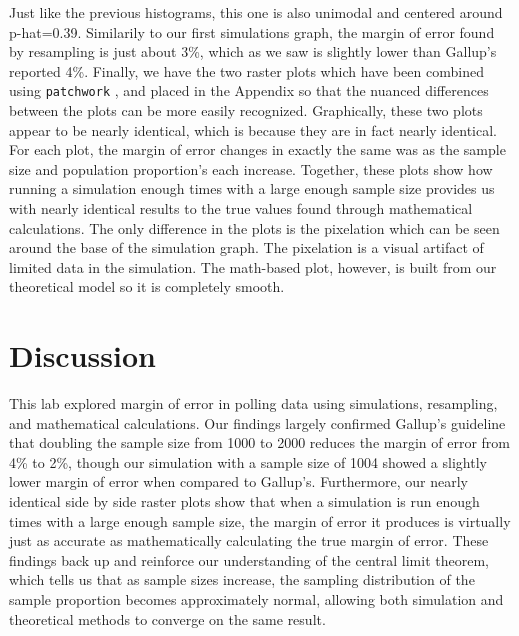 \documentclass{article}\usepackage[]{graphicx}\usepackage[]{xcolor}
\begin{document}
\begin{multicols}{2}
\indent 
Just like the previous histograms, this one is also unimodal and centered around p-hat=0.39. Similarily to our first simulations graph, the margin of error found by resampling is just about 3\%, which as we saw is slightly lower than Gallup's reported 4\%.
\newline
\indent
Finally, we have the two raster plots which have been combined using \texttt{patchwork} \citep{patchwork}, and placed in the Appendix so that the nuanced differences between the plots can be more easily recognized. Graphically, these two plots appear to be nearly identical, which is because they are in fact nearly identical. For each plot, the margin of error changes in exactly the same was as the sample size and population proportion's each increase. Together, these plots show how running a simulation enough times with a large enough sample size provides us with nearly identical results to the true values found through mathematical calculations. The only difference in the plots is the pixelation which can be seen around the base of the simulation graph. The pixelation is a visual artifact of limited data in the simulation. The math-based plot, however, is built from our theoretical model so it is completely smooth.


\section{Discussion}
This lab explored margin of error in polling data using simulations, resampling, and mathematical calculations. Our findings largely confirmed Gallup's guideline that doubling the sample size from 1000 to 2000 reduces the margin of error from 4\% to 2\%, though our simulation with a sample size of 1004 showed a slightly lower margin of error when compared to Gallup's. Furthermore, our nearly identical side by side raster plots show that when a simulation is run enough times with a large enough sample size, the margin of error it produces is virtually just as accurate as mathematically calculating the true margin of error. These findings back up and reinforce our understanding of the central limit theorem, which tells us that as sample sizes increase, the sampling distribution of the sample proportion becomes approximately normal, allowing both simulation and theoretical methods to converge on the same result.




\vspace{2em}


\nocite{patchwork}
\nocite{tidyverse}

\begin{tiny}

\end{tiny}
\end{multicols}
\end{document}
